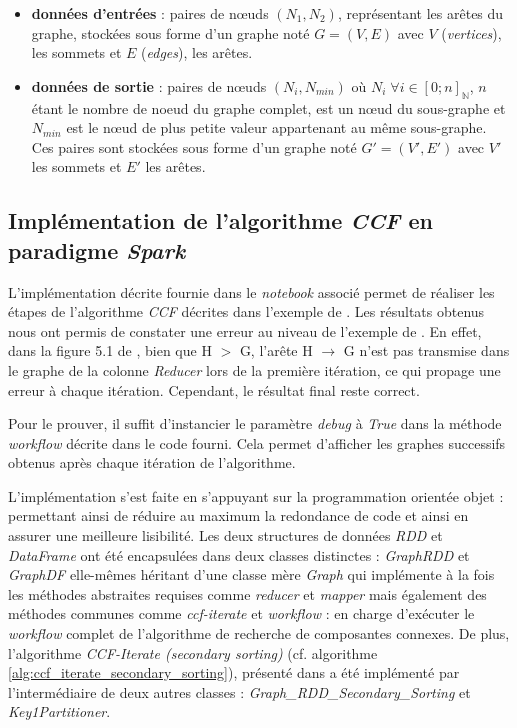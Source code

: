 \documentclass[conference]{IEEEtran}
\begin{document}
\begin{itemize}
\item \textbf{données d'entrées} : paires de nœuds $(N_{1}, N_{2})$, représentant les arêtes du graphe, stockées sous forme d'un graphe noté $G = (V, E)$ avec $V$ (\textit{vertices}), les sommets et $E$ (\textit{edges}), les arêtes.
\item \textbf{données de sortie} : paires de nœuds $(N_{i}, N_{min})$ où $N_{i} \; \forall i \in [0;n]_{\mathbb{N}}$, $n$ étant le nombre de noeud du graphe complet, est un nœud du sous-graphe et $N_{min}$ est le nœud de plus petite valeur appartenant au même sous-graphe. Ces paires sont stockées sous forme d'un graphe noté $G' = (V', E')$ avec $V'$ les sommets et $E'$ les arêtes.
\end{itemize}

\balance %

\subsection{Implémentation de l'algorithme \textit{CCF} en paradigme \textit{Spark}}

L'implémentation décrite fournie dans le \textit{notebook} associé permet de réaliser les étapes de l'algorithme \textit{CCF} décrites dans l'exemple de \cite{6785473}. Les résultats obtenus nous ont permis de constater une erreur au niveau de l'exemple de \cite{6785473}. En effet, dans la figure 5.1 de \cite{6785473}, bien que H $>$ G, l'arête H $\rightarrow$ G n'est pas transmise dans le graphe de la colonne \textit{Reducer} lors de la première itération, ce qui propage une erreur à chaque itération. Cependant, le résultat final reste correct.

Pour le prouver, il suffit d'instancier le paramètre \textit{debug} à \textit{True} dans la méthode \textit{workflow} décrite dans le code fourni. Cela permet d'afficher les graphes successifs obtenus après chaque itération de l'algorithme.

L'implémentation s'est faite en s'appuyant sur la programmation orientée objet : permettant ainsi de réduire au maximum la redondance de code et ainsi en assurer une meilleure lisibilité. Les deux structures de données \textit{RDD} et \textit{DataFrame} ont été encapsulées dans deux classes distinctes : \textit{GraphRDD} et \textit{GraphDF} elle-mêmes héritant d'une classe mère \textit{Graph} qui implémente à la fois les méthodes abstraites requises comme \textit{reducer} et \textit{mapper} mais également des méthodes communes comme \textit{ccf-iterate} et \textit{workflow} : en charge d'exécuter le \textit{workflow} complet de l'algorithme de recherche de composantes connexes.
De plus, l'algorithme \textit{CCF-Iterate (secondary sorting)} (cf. algorithme \ref{alg:ccf_iterate_secondary_sorting}), présenté dans \cite{lin2010data} a été implémenté par l'intermédiaire de deux autres classes : \textit{Graph\_RDD\_Secondary\_Sorting} et \textit{Key1Partitioner}.
\end{document}
